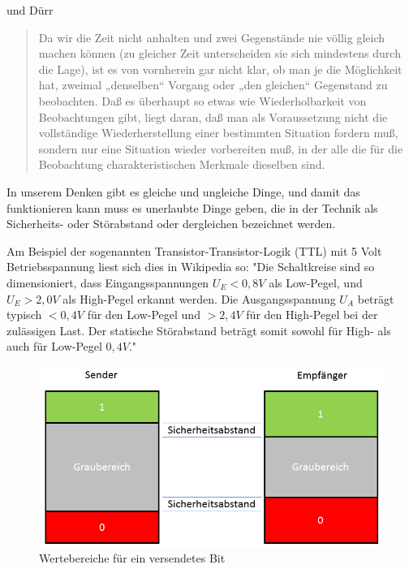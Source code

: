 \documentclass[12pt]{book}
\begin{document}
und Dürr

\begin{quote}\begin{tcolorbox}
Da wir die Zeit nicht anhalten und zwei Gegenstände nie völlig gleich machen können (zu gleicher Zeit unterscheiden sie sich mindestens durch die Lage), ist es von vornherein gar nicht klar, ob man je die Möglichkeit hat, zweimal „denselben“ Vorgang oder „den gleichen“ Gegenstand zu beobachten. Daß es überhaupt so etwas wie Wiederholbarkeit von Beobachtungen gibt, liegt daran, daß man als Voraussetzung nicht die vollständige Wiederherstellung einer bestimmten Situation fordern muß, sondern nur eine Situation wieder vorbereiten muß, in der alle die für die Beobachtung charakteristischen Merkmale dieselben sind.
\end{tcolorbox}\end{quote}

In unserem Denken gibt es gleiche und ungleiche Dinge, und damit das funktionieren kann muss es unerlaubte Dinge geben, die in der Technik als Sicherheits- oder Störabstand oder dergleichen bezeichnet werden.

Am Beispiel der sogenannten Transistor-Transistor-Logik (TTL) mit 5 Volt Betriebsspannung liest sich dies in Wikipedia so:
"Die Schaltkreise sind so dimensioniert, dass Eingangsspannungen $U_E < 0,8 V$ als Low-Pegel, und $U_E > 2,0 V$ als High-Pegel erkannt werden.
Die Ausgangsspannung $U_A$ beträgt typisch $< 0,4 V$ für den Low-Pegel und $> 2,4 V$ für den High-Pegel bei der zulässigen Last.
Der statische Störabstand beträgt somit sowohl für High- als auch für Low-Pegel $0,4 V$."

\begin{figure}[!h]\begin{center}
  \includegraphics[width=13cm]{Bilder/KlassischesBit.png}
  \caption{Wertebereiche für ein versendetes Bit}
  \label{fig:sr_game}
\end{center}\end{figure}
\end{document}
